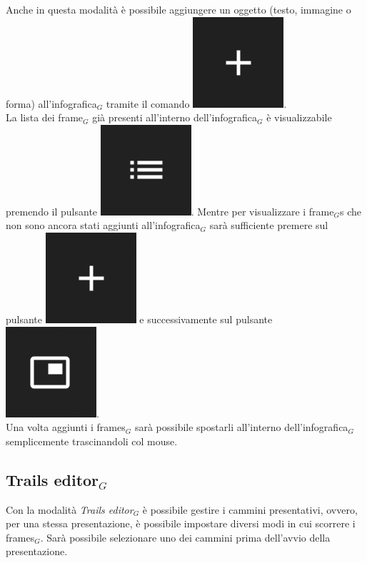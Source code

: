 Anche in questa modalità è possibile aggiungere un oggetto (testo, immagine o forma) all'infografica$_G$ tramite il comando \includegraphics[scale=0.4]{img/add_object.png}.\\
La lista dei frame$_G$ già presenti all'interno dell'infografica$_G$ è visualizzabile premendo il pulsante \includegraphics[scale=0.4]{img/slides_list.png}.
Mentre per visualizzare i frame$_G$s che non sono ancora stati aggiunti all'infografica$_G$ sarà sufficiente premere sul pulsante \includegraphics[scale=0.4]{img/add_object.png} e successivamente sul pulsante \includegraphics[scale=0.4]{img/add_frame.png}.\\
Una volta aggiunti i frames$_G$ sarà possibile spostarli all'interno dell'infografica$_G$ semplicemente trascinandoli col mouse.

\newpage
\subsection{Trails editor$_G$}
Con la modalità \emph{Trails editor$_G$} è possibile gestire i cammini presentativi, ovvero, per una stessa presentazione, è possibile impostare diversi modi in cui scorrere i frames$_G$. Sarà possibile selezionare uno dei cammini prima dell'avvio della presentazione.\\

